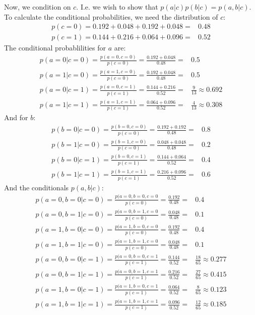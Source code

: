 \documentclass[12pt, a4paper]{article}
\numberwithin{equation}{section}
\begin{document}
Now, we condition on $c$. I.e. we wish to show that $p(a|c)p(b|c)=p(a,b|c)$. To calculate the conditional probabilities, we need the distribution of $c$:
\begin{align}
p(c=0)=0.192+0.048+0.192+0.048=& 0.48 \\
p(c=1)=0.144+0.216+0.064+0.096=& 0.52
\end{align}
The conditional probablilities for $a$ are:
\begin{align}
p(a=0|c=0)=\frac{p(a=0,c=0)}{p(c=0)}=\frac{0.192+0.048}{0.48}=& 0.5 \\
p(a=1|c=0)=\frac{p(a=1,c=0)}{p(c=0)}=\frac{0.192+0.048}{0.48}=& 0.5 \\
p(a=0|c=1)=\frac{p(a=0,c=1)}{p(c=1)}=\frac{0.144+0.216}{0.52}=& \frac{9}{13}\approx 0.692 \\
p(a=1|c=1)=\frac{p(a=1,c=1)}{p(c=1)}=\frac{0.064+0.096}{0.52}=& \frac{4}{13}\approx 0.308
\end{align}
And for $b$:
\begin{align}
p(b=0|c=0)=\frac{p(b=0,c=0)}{p(c=0)}=\frac{0.192+0.192}{0.48}=& 0.8 \\
p(b=1|c=0)=\frac{p(b=1,c=0)}{p(c=0)}=\frac{0.048+0.048}{0.48}=& 0.2 \\
p(b=0|c=1)=\frac{p(b=0,c=1)}{p(c=1)}=\frac{0.144+0.064}{0.52}=& 0.4 \\
p(b=1|c=1)=\frac{p(b=1,c=1)}{p(c=1)}=\frac{0.216+0.096}{0.52}=& 0.6
\end{align}
And the conditionals $p(a,b|c)$:
\begin{align}
p(a=0,b=0|c=0)=\frac{p(a=0,b=0,c=0}{p(c=0)}=\frac{0.192}{0.48}=& 0.4 \\
p(a=0,b=1|c=0)=\frac{p(a=0,b=1,c=0}{p(c=0)}=\frac{0.048}{0.48}=& 0.1 \\
p(a=1,b=0|c=0)=\frac{p(a=1,b=0,c=0}{p(c=0)}=\frac{0.192}{0.48}=& 0.4 \\
p(a=1,b=1|c=0)=\frac{p(a=1,b=1,c=0}{p(c=0)}=\frac{0.048}{0.48}=& 0.1 \\
p(a=0,b=0|c=1)=\frac{p(a=0,b=0,c=1}{p(c=1)}=\frac{0.144}{0.52}=& \frac{18}{65}\approx 0.277 \\
p(a=0,b=1|c=1)=\frac{p(a=0,b=1,c=1}{p(c=1)}=\frac{0.216}{0.52}=& \frac{27}{65}\approx 0.415 \\
p(a=1,b=0|c=1)=\frac{p(a=1,b=0,c=1}{p(c=1)}=\frac{0.064}{0.52}=& \frac{8}{65}\approx 0.123 \\
p(a=1,b=1|c=1)=\frac{p(a=1,b=1,c=1}{p(c=1)}=\frac{0.096}{0.52}=& \frac{12}{65}\approx 0.185 
\end{align}
\end{document}
